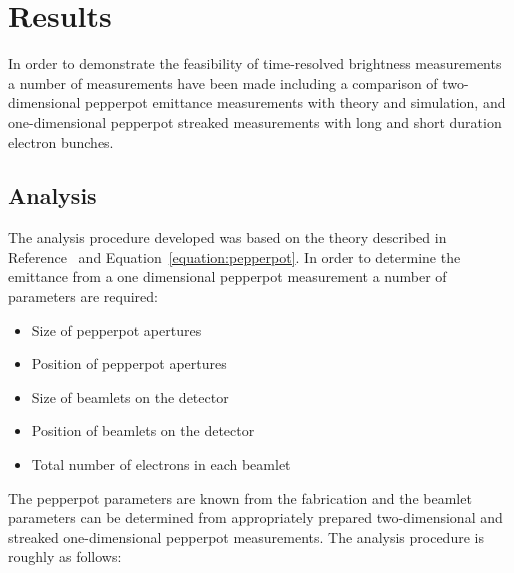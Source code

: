 \section{Results}
In order to demonstrate the feasibility of time-resolved brightness measurements a number of measurements have been made including a comparison of two-dimensional pepperpot emittance measurements with theory and simulation, and one-dimensional pepperpot streaked measurements with long and short duration electron bunches.

\subsection{Analysis}
The analysis procedure developed was based on the theory described in Reference~\cite{zhang_emittance_1996} and Equation~\ref{equation:pepperpot}.
In order to determine the emittance from a one dimensional pepperpot measurement a number of parameters are required:
\begin{itemize}
    \item Size of pepperpot apertures
    \item Position of pepperpot apertures
    \item Size of beamlets on the detector
    \item Position of beamlets on the detector
    \item Total number of electrons in each beamlet
\end{itemize}
The pepperpot parameters are known from the fabrication and the beamlet parameters can be determined from appropriately prepared two-dimensional and streaked one-dimensional pepperpot measurements.
The analysis procedure is roughly as follows:
